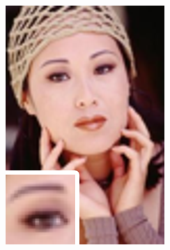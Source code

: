 \documentclass[
			fontsize = 12pt,
			paper = a4
			]
			{scrartcl}%
\newcommand{\?}{\ensuremath{^\texttt{\textbf [CITATION~NEEDED]}}}
\begin{document}
\begin{figure}[!ht]
\begin{subfigure}[b]{0.3\textwidth}
         \includegraphics[width=\textwidth]{fig/examples/woman_bicubic_x3}
     \end{subfigure}
     \hfill
     \begin{subfigure}[b]{0.3\textwidth}
         \centering

\end{subfigure}
\end{figure}
\end{document}
